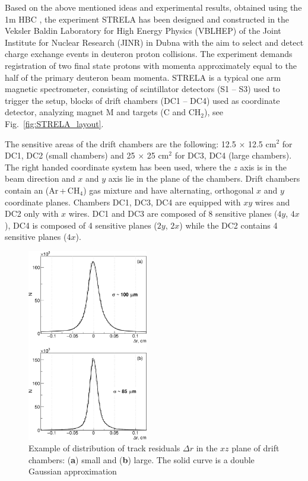 \documentclass[twocolumn,epjc3]{svjour3}
\begin{document}
Based on the above mentioned ideas and experimental results, obtained using the
1m HBC \cite{gla02,gla08}, the experiment STRELA has been designed and
constructed in the Veksler Baldin Laboratory for High Energy Physics (VBLHEP) of
the Joint Institute for Nuclear Research (JINR) in Dubna with the aim to select
and detect charge exchange events in deuteron proton collisions. The experiment
demands registration of two final state protons with momenta approximately equal
to the half of the primary deuteron beam momenta. STRELA is a typical one arm
magnetic spectrometer, consisting of scintillator detectors (S1 -- S3) used to
trigger the setup, blocks of drift chambers (DC1 -- DC4) used as coordinate
detector, analyzing magnet M and targets (C and CH$_2$), see
Fig.~\ref{fig:STRELA_layout}.

The sensitive areas of the drift chambers are the following: 12.5 $\times$ 12.5
cm$^2$ for DC1, DC2 (small chambers) and 25 $\times$ 25 cm$^2$ for DC3, DC4
(large chambers). The right handed coordinate system has been used, where the
$z$ axis is in the beam direction and $x$ and $y$ axis lie in the plane of the
chambers. Drift chambers contain an (Ar\,+\,CH$_4$) gas mixture and have
alternating, orthogonal $x$ and $y$ coordinate planes. Chambers DC1, DC3, DC4
are equipped with $xy$ wires and DC2 only with $x$ wires. DC1 and DC3 are
composed of 8 sensitive planes ($4y$, $4x$), DC4 is composed of 4 sensitive
planes ($2y$, $2x$) while the DC2 contains 4 sensitive planes ($4x$).

\begin{figure}[t]
  \centering
  \includegraphics[width=0.47\textwidth]{res_chambers.pdf}
  \caption{Example of distribution of track residuals $\Delta r$ in the $xz$
    plane of drift chambers: (\textbf{a}) small and (\textbf{b}) large. The
    solid curve is a double Gaussian approximation \cite{gla13}}
  \label{fig:res_chambers}
\end{figure}
\end{document}
